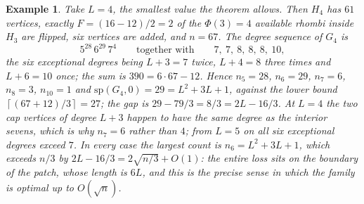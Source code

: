 \documentclass[12pt,a4paper]{article}%
\newtheorem{example}[theorem]{Example}
\begin{document}
\begin{example}
\label{Ex_hexL4}Take $L=4$, the smallest value the theorem allows. Then $H_{4}$
has $61$ vertices, exactly $F=(16-12)/2=2$ of the $\Phi (3)=4$ available rhombi
inside $H_{3}$ are flipped, six vertices are added, and $n=67$. The degree
sequence of $G_{4}$ is
\[
5^{28}\,6^{29}\,7^{4}\qquad \text{together with}\qquad 7,\ 7,\ 8,\ 8,\ 8,\ 10,
\]
the six exceptional degrees being $L+3=7$ twice, $L+4=8$ three times and
$L+6=10$ once; the sum is $390=6\cdot 67-12$. Hence $n_{5}=28$, $n_{6}=29$,
$n_{7}=6$, $n_{8}=3$, $n_{10}=1$ and
$\mathrm{sp}(G_{4},0)=29=L^{2}+3L+1$, against the lower bound
$\left\lceil (67+12)/3\right\rceil =27$; the gap is $29-79/3=8/3=2L-16/3$.
At $L=4$ the two cap vertices of degree $L+3$ happen to have the same degree as
the interior sevens, which is why $n_{7}=6$ rather than $4$; from $L=5$ on all
six exceptional degrees exceed $7$. In every case the largest count is
$n_{6}=L^{2}+3L+1$, which exceeds $n/3$ by $2L-16/3=2\sqrt{n/3}+O(1)$: the
entire loss sits on the boundary of the patch, whose length is $6L$, and this is
the precise sense in which the family is optimal up to $O(\sqrt{n})$.
\end{example}
%
\end{document}
